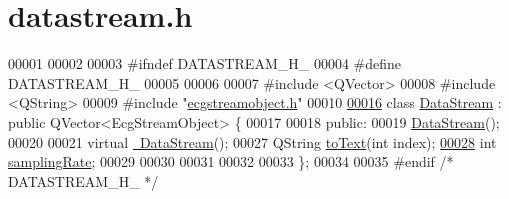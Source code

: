 \hypertarget{datastream_8h_source}{}\section{datastream.\+h}
\label{datastream_8h_source}

\begin{DoxyCode}
00001 
00002 
00003 \textcolor{preprocessor}{#ifndef DATASTREAM\_H\_}
00004 \textcolor{preprocessor}{#define DATASTREAM\_H\_}
00005 
00006 
00007 \textcolor{preprocessor}{#include <QVector>}
00008 \textcolor{preprocessor}{#include <QString>}
00009 \textcolor{preprocessor}{#include "\hyperlink{ecgstreamobject_8h}{ecgstreamobject.h}"}
00010 
\hypertarget{datastream_8h_source.tex_l00016}{}\hyperlink{classDataStream}{00016} \textcolor{keyword}{class }\hyperlink{classDataStream}{DataStream} : \textcolor{keyword}{public} QVector<EcgStreamObject> \{
00017 
00018 \textcolor{keyword}{public}:
00019     \hyperlink{classDataStream_aadb8f27fe18a349a25b2cd656d686f92}{DataStream}();
00020 
00021     \textcolor{keyword}{virtual} \hyperlink{classDataStream_ab1ab2421685bd8ee669ec94d3b0239b8}{~DataStream}();
00027     QString \hyperlink{classDataStream_a4876a67f0408d22a85ab785a138bcf35}{toText}(\textcolor{keywordtype}{int} index);
\hypertarget{datastream_8h_source.tex_l00028}{}\hyperlink{classDataStream_a5b27985e1e797aad7dead2fa690b1638}{00028}     \textcolor{keywordtype}{int} \hyperlink{classDataStream_a5b27985e1e797aad7dead2fa690b1638}{samplingRate};
00029 
00030 
00031 
00032 
00033 \};
00034 
00035 \textcolor{preprocessor}{#endif }\textcolor{comment}{/* DATASTREAM\_H\_ */}\textcolor{preprocessor}{}
\end{DoxyCode}

